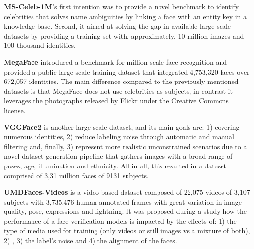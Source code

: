 \documentclass[class=report, crop=false, a4paper, 12pt]{standalone}
\begin{document}

\vspace{0.7\baselineskip}
\noindent\textbf{MS-Celeb-1M}'s \autocite{guoMSCeleb1MDatasetBenchmark2016} first intention was to provide a novel benchmark to identify celebrities that solves name ambiguities by linking a face with an entity key in a knowledge base. Second, it aimed at solving the gap in available large-scale datasets by providing a training set with, approximately, 10 million images and 100 thousand identities.

\vspace{0.7\baselineskip}
\noindent\textbf{MegaFace} \autocite{nechLevelPlayingField2017} introduced a benchmark for million-scale face recognition and provided a public large-scale training dataset that integrated 4,753,320 faces over 672,057 identities. The main difference compared to the previously mentioned datasets is that MegaFace does not use celebrities as subjects, in contrast it leverages the photographs released by Flickr under the Creative Commons license. 

\vspace{0.7\baselineskip}
\noindent\textbf{VGGFace2} \autocite{caoVGGFace2DatasetRecognising2018} is another large-scale dataset, and its main goals are: 1) covering numerous identities, 2) reduce labeling noise through automatic and manual filtering and, finally, 3) represent more realistic unconstrained scenarios due to a novel dataset generation pipeline that gathers images with a broad range of poses, age, illumination and ethnicity. All in all, this resulted in a dataset comprised of 3,31 million faces of 9131 subjects.

\vspace{0.7\baselineskip}
\noindent\textbf{UMDFaces-Videos} \autocite{bansalDonTsCNNbased2017} is a video-based dataset composed of 22,075 videos of 3,107 subjects with 3,735,476 human annotated frames with great variation in image quality, pose, expressions and lightning. It was proposed during a study how the performance of a face verification models is impacted by the effects of: 1) the type of media used for training (only videos or still images vs a mixture of both), 2) , 3) the label's noise and 4) the alignment of the faces.


\end{document}

